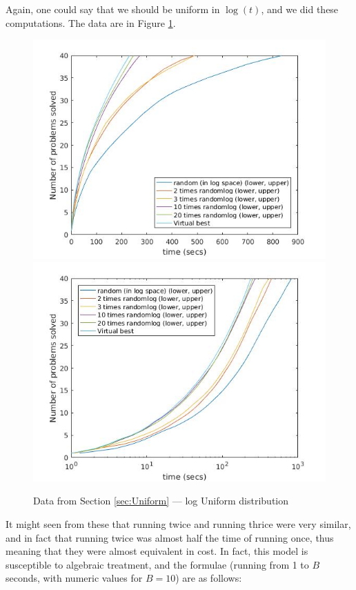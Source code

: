 \documentclass{easychair}
\begin{document}
Again, one could say that we should be uniform in $\log(t)$, and we did these computations.
The data are in Figure  \ref{Fig:Uniformlog}.
\begin{figure}[h]
\caption{Data from Section \ref{sec:Uniform} --- log Uniform distribution\label{Fig:Uniformlog}}
\includegraphics[scale=0.4]{Runiflog20.jpg}
\includegraphics[scale=0.4]{Rloguniflog20.jpg}
\end{figure}
It might seen from these that running twice and running thrice were very similar, and in fact that running twice was almost half the time of running once, thus meaning that they were almost equivalent in cost. In fact, this model is susceptible to algebraic treatment,
and the formulae (running from 1 to $B$ seconds, with numeric values for $B=10$) are as follows:
\end{document}
